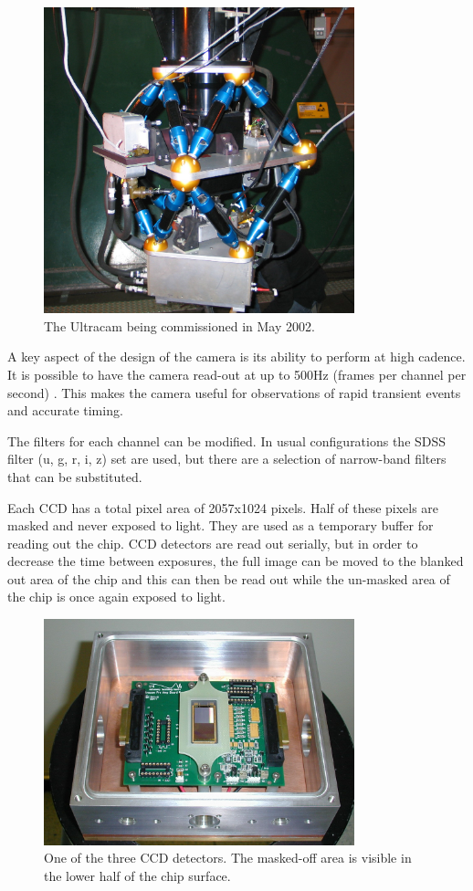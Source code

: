 \documentclass[a4paper,10pt]{article}
\begin{document}
\begin{figure}[!h]
\centering
\includegraphics[width=90mm]{images/IMG_0121_scaled.JPG}
\caption{The Ultracam being commissioned in May 2002.}
\label{fig1}
\end{figure}


A key aspect of the design of the camera is its ability to perform at high cadence. It is possible to have the camera read-out at up to 500Hz (frames per channel per second) \cite{dhillon07}. This makes the camera useful for observations of rapid transient events and accurate timing. 

The filters for each channel can be modified. In usual configurations the SDSS filter (u, g, r, i, z) set are used, but there are a selection of narrow-band filters that can be substituted.  

Each CCD has a total pixel area of 2057x1024 pixels. Half of these pixels are masked and never exposed to light. They are used as a temporary buffer for reading out the chip. CCD detectors are read out serially, but in order to decrease the time between exposures, the full image can be moved to the blanked out area of the chip and this can then be read out while the un-masked area of the chip is once again exposed to light. 

\begin{figure}[!h]
\centering
\includegraphics[width=90mm]{images/ccd.png}
\caption{One of the three CCD detectors. The masked-off area is visible in the lower half of the chip surface.}
\label{fig2}
\end{figure}
\end{document}
